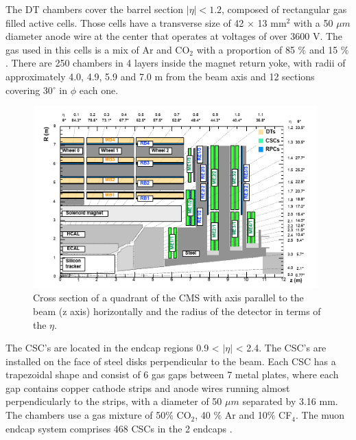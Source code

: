  
The DT chambers cover the barrel section $|\eta|<1.2$, composed of rectangular gas filled active cells. Those cells have a transverse size of 42 $\times$ 13 mm$^2$ with a 50 $\mu m$ diameter anode wire at the center that operates at voltages of over 3600 V. The gas used in this cells is a mix of Ar and CO$_2$ with a proportion of 85 $\%$ and 15 $\%$. There are 250 chambers in 4 layers inside the magnet return yoke, with radii of approximately 4.0, 4.9, 5.9 and 7.0 m from the beam axis and 12 sections covering 30$^\circ$ in $\phi$ each one.

\begin{figure}[ht]
	\centering
	\includegraphics[width=11cm,height=7cm]{Chapter2/csc}
	\caption[Cross section of a quadrant of the CMS with axis parallel to the beam (z axis) horizontally and the radius of the detector in terms of the $\eta$]{Cross section of a quadrant of the CMS with axis parallel to the beam (z axis) horizontally and the radius of the detector in terms of the $\eta$\cite{cms-manual}.}
	\label{dt}
\end{figure}

The CSC's are located in the endcap regions 0.9 < $|\eta|$ < 2.4. The CSC's are installed on the face of steel disks perpendicular to the beam. 
Each CSC has a trapezoidal shape and consist of 6 gas gaps between 7 metal plates, where each gap contains copper cathode strips and anode wires running almost perpendicularly to
the strips, with a diameter of 50 $\mu m$ separated by 3.16 mm. 
The chambers use a gas mixture of 50$\%$ CO$_2$, 40 $\%$ Ar and 10$\%$ CF$_4$. The muon endcap system comprises 468 CSCs in the 2 endcaps \cite{cms-manual,cms7}.


